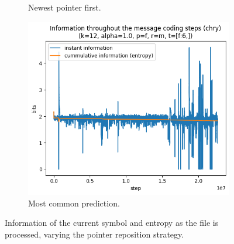 \documentclass{article}
\begin{document}
\begin{figure}
\begin{subfigure}[b]{0.3\textwidth}
\begin{center}
        \end{center}
        \caption{Newest pointer first.}
        \label{fig:results-reposition-o}
    \end{subfigure}
    \hfill
    \begin{subfigure}[b]{0.3\textwidth}
        \begin{center}
            \includegraphics[width=1.0\linewidth]{../scripts/images/chry_12_1.0_f_m_[f:6,].png}
        \end{center}
        \caption{Most common prediction.}
        \label{fig:results-reposition-m}
    \end{subfigure}
    \caption{Information of the current symbol and entropy as the file is processed, varying the pointer reposition strategy.}
    \label{fig:results-reposition}
\end{figure}
\end{document}
